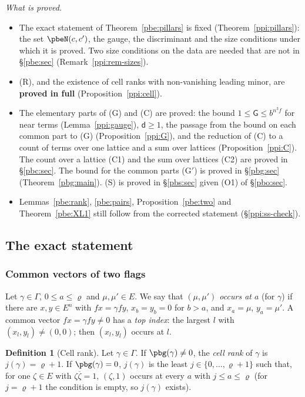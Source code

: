 \documentclass[10pt]{amsart}
\theoremstyle{definition}
\newtheorem{definition}[theorem]{Definition}
\theoremstyle{remark}
\providecommand{\aubar}[1]{\overline{#1}}
\begin{document}
\emph{What is proved.}
\begin{itemize}
\item[(1)] The exact statement of Theorem~\ref{pbe:pillars} is fixed (Theorem~\ref{ppi:pillars}):
the set $\pbeN(c,c')$, the gauge, the discriminant and the size conditions under which it is
proved. Two size conditions on the data are needed that are not in \S\ref{pbe:sec}
(Remark~\ref{ppi:rem-sizes}).
\item[(2)] \textup{(R)}, and the existence of cell ranks with non-vanishing leading minor, are
\textbf{proved in full} (Proposition~\ref{ppi:cell}).
\item[(3)] The elementary parts of \textup{(G)} and \textup{(C)} are proved: the bound $1\le\mathsf
G\le b^{n^3f}$ for near terms (Lemma~\ref{ppi:gauge}), $\mathsf d\ge1$, the passage from the bound on
each common part to \textup{(G)} (Proposition~\ref{ppi:G}), and the reduction of \textup{(C)} to a
count of terms over one lattice and a sum over lattices (Proposition~\ref{ppi:C}).
The count over a lattice (C1) and the sum over lattices (C2) are proved in \S\ref{pbc:sec}. The bound for the common parts (G$'$) is proved in \S\ref{pbg:sec} (Theorem~\ref{pbg:main}). \textup{(S)} is proved in \S\ref{pbs:sec} given (O1) of \S\ref{pbo:sec}.
\item[(4)] Lemmas~\ref{pbe:rank}, \ref{pbe:pairs}, Proposition~\ref{pbe:two} and
Theorem~\ref{pbe:XL1} still follow from the corrected statement (\S\ref{ppi:ss-check}).
\end{itemize}

\subsection{The exact statement}\label{ppi:ss-statement}

\subsubsection*{Common vectors of two flags}
Let $\gamma\in\Gamma$, $0\le a\le\varrho$ and $\mu,\mu'\in E$. We say that \emph{$(\mu,\mu')$ occurs at
$a$} (for $\gamma$) if there are $x,y\in E^n$ with $fx=\gamma fy$, $x_b=y_b=0$ for $b>a$, and
$x_a=\mu$, $y_a=\mu'$. A common vector $fx=\gamma fy\ne0$ has a \emph{top index}: the largest $l$
with $(x_l,y_l)\ne(0,0)$; then $(x_l,y_l)$ occurs at $l$.

\begin{definition}[Cell rank]\label{ppi:def-cell}
Let $\gamma\in\Gamma$. If $\pbg(\gamma)\ne0$, the \emph{cell rank} of $\gamma$ is $j(\gamma)=\varrho+
1$. If $\pbg(\gamma)=0$, $j(\gamma)$ is the least $j\in\{0,\dots,\varrho+1\}$ such that, for one
$\zeta\in E$ with $\zeta\aubar\zeta=1$, $(\zeta,1)$ occurs at every $a$ with $j\le a\le\varrho$ (for
$j=\varrho+1$ the condition is empty, so $j(\gamma)$ exists).
\end{definition}
\end{document}
